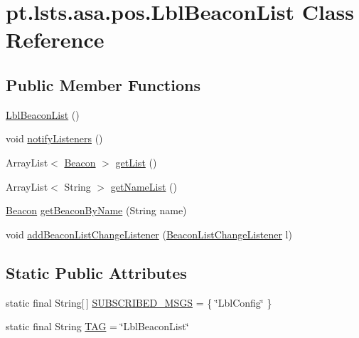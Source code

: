 \hypertarget{classpt_1_1lsts_1_1asa_1_1pos_1_1LblBeaconList}{}\section{pt.\+lsts.\+asa.\+pos.\+Lbl\+Beacon\+List Class Reference}
\label{classpt_1_1lsts_1_1asa_1_1pos_1_1LblBeaconList}
\subsection*{Public Member Functions}
\begin{DoxyCompactItemize}
\item 
\hyperlink{classpt_1_1lsts_1_1asa_1_1pos_1_1LblBeaconList_a587615b5e53ce4ab7eb1c07912afb737}{Lbl\+Beacon\+List} ()
\item 
void \hyperlink{classpt_1_1lsts_1_1asa_1_1pos_1_1LblBeaconList_ac773b3c4abec186552d723770248b952}{notify\+Listeners} ()
\item 
Array\+List$<$ \hyperlink{classpt_1_1lsts_1_1asa_1_1pos_1_1Beacon}{Beacon} $>$ \hyperlink{classpt_1_1lsts_1_1asa_1_1pos_1_1LblBeaconList_aa0f3b34a25074943d634454e7bda8669}{get\+List} ()
\item 
Array\+List$<$ String $>$ \hyperlink{classpt_1_1lsts_1_1asa_1_1pos_1_1LblBeaconList_adce35cd29b4b16707bf28a6c750ee59f}{get\+Name\+List} ()
\item 
\hyperlink{classpt_1_1lsts_1_1asa_1_1pos_1_1Beacon}{Beacon} \hyperlink{classpt_1_1lsts_1_1asa_1_1pos_1_1LblBeaconList_a924b922c7971f11906c55be14b93be1c}{get\+Beacon\+By\+Name} (String name)
\item 
void \hyperlink{classpt_1_1lsts_1_1asa_1_1pos_1_1LblBeaconList_a982c9483da0e1ec3fa53e9bec511fbd2}{add\+Beacon\+List\+Change\+Listener} (\hyperlink{interfacept_1_1lsts_1_1asa_1_1listenners_1_1BeaconListChangeListener}{Beacon\+List\+Change\+Listener} l)
\end{DoxyCompactItemize}
\subsection*{Static Public Attributes}
\begin{DoxyCompactItemize}
\item 
static final String\mbox{[}$\,$\mbox{]} \hyperlink{classpt_1_1lsts_1_1asa_1_1pos_1_1LblBeaconList_a3e8fd5179c8a1b4ce340ac6d90bd38a5}{S\+U\+B\+S\+C\+R\+I\+B\+E\+D\+\_\+\+M\+S\+G\+S} = \{ \char`\"{}Lbl\+Config\char`\"{} \}
\item 
static final String \hyperlink{classpt_1_1lsts_1_1asa_1_1pos_1_1LblBeaconList_a5275cc5b312241a0fe5454d8066decd8}{T\+A\+G} = \char`\"{}Lbl\+Beacon\+List\char`\"{}
\end{DoxyCompactItemize}
